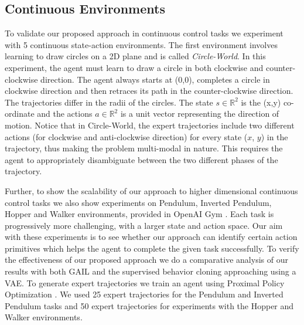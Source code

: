 \documentclass{article} %
\begin{document}

\subsection{Continuous Environments}

To validate our proposed approach in continuous control tasks we experiment
with 5 continuous state-action environments.
The first environment involves learning to draw circles on a 2D plane and is called \textit{Circle-World}. In this experiment, the agent must learn to draw a circle in both clockwise and counter-clockwise direction. The agent always starts at (0,0), completes a circle in clockwise direction and then retraces its path in the counter-clockwise direction. The trajectories differ in the radii of the circles. The state $s \in \mathbb{R}^2$ is the (x,y) co-ordinate and the actions $a \in \mathbb{R}^2$ is a unit vector representing the direction of motion.
Notice that in Circle-World, the expert trajectories include two different actions (for clockwise and anti-clockwise direction) for every state ($x$, $y$) in the trajectory, thus making the problem multi-modal in nature.
This requires the agent to appropriately disambiguate between the two different phases of the trajectory.

Further, to show the scalability of our approach to higher dimensional continuous control tasks we also show experiments on Pendulum, Inverted Pendulum, Hopper and Walker environments, provided in OpenAI Gym \citep{openai_gym}. Each task is progressively more challenging, with a larger state and action space. 
Our aim with these experiments is to see whether our approach can identify certain action primitives which helps the agent to complete the given task successfully. 
To verify the effectiveness of our proposed approach we do a comparative analysis of our results with both GAIL \citep{ho2016generative} and the supervised behavior cloning approaching using a VAE.
To generate expert trajectories we train an agent using Proximal Policy Optimization \citep{schulman2017proximal}. We used 25 expert trajectories for the Pendulum and Inverted Pendulum tasks and 50 expert trajectories for experiments with the Hopper and Walker environments.
\end{document}
